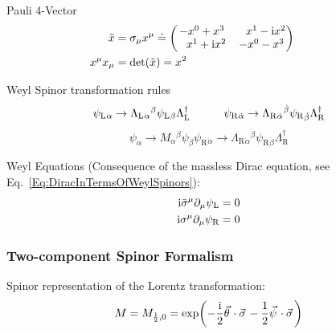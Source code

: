 			\noindent
			Pauli 4-Vector
			\begin{equation}
				\begin{aligned}
					\tilde{x} &= \sigma_\mu x^\mu \doteq \mqty(
					-x^0 + x^3 & \phantom{-}x^1 - \i x^2 \\
					\phantom{-}x^1 + \i x^2 & -x^0 - x^3 \\
					) \hsp \\
					x^\mu x_\mu &= \det(\tilde{x}) = x^2 \\
				\end{aligned}
			\end{equation}

			\noindent
			Weyl Spinor transformation rules
			\begin{equation}
				\psi_\text{L}{}_{\alpha} \to \Lambda_\text{L}{}_{\alpha}{}^\beta \psi_\text{L}{}_{\beta} \Lambda_\text{L}^\dagger \hspace{30pt}
				\psi_\text{R}{}_{\dot{\alpha}} \to \Lambda_\text{R}{}_{\dot{\alpha}}{}^{\dot{\beta}} \psi_\text{R}{}_{\dot{\beta}} \Lambda_\text{R}^\dagger
			\end{equation}
			\begin{equation}
				\psi_{\alpha} \to M_{\alpha}{}^\beta \psi_\beta
				\psi_\text{R}{}_{\dot{\alpha}} \to \Lambda_\text{R}{}_{\dot{\alpha}}{}^{\dot{\beta}} \psi_\text{R}{}_{\dot{\beta}} \Lambda_\text{R}^\dagger
			\end{equation}

			\noindent
			Weyl Equations (Consequence of the massless Dirac equation, see Eq.~\ref{Eq:DiracInTermsOfWeylSpinors}):
			\begin{equation}
				\begin{aligned}
					\mathrm{i} \bar{\sigma}^\mu \partial_\mu \psi_\text{L} &= 0 \\
					\mathrm{i} \sigma^\mu \partial_\mu \psi_\text{R} &= 0 \\
				\end{aligned}
			\end{equation}

		\subsubsection{Two-component Spinor Formalism}
			Spinor representation of the Lorentz transformation:
			\begin{equation}
				M=M_{\frac{1}{2},0} = \exp(-\frac{\i}{2} \vec{\theta}\cdot\vec{\sigma} - \frac{1}{2} \vec{\psi}\cdot\vec{\sigma})
			\end{equation}

